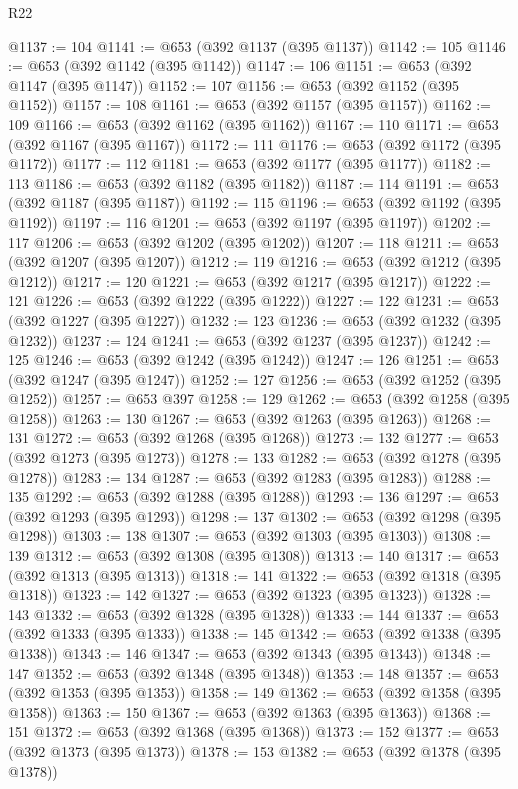 \begin{lexlean}{R22}
\begin{coremodule}
@1137 := 104
@1141 := @653 (@392 @1137 (@395 @1137))
@1142 := 105
@1146 := @653 (@392 @1142 (@395 @1142))
@1147 := 106
@1151 := @653 (@392 @1147 (@395 @1147))
@1152 := 107
@1156 := @653 (@392 @1152 (@395 @1152))
@1157 := 108
@1161 := @653 (@392 @1157 (@395 @1157))
@1162 := 109
@1166 := @653 (@392 @1162 (@395 @1162))
@1167 := 110
@1171 := @653 (@392 @1167 (@395 @1167))
@1172 := 111
@1176 := @653 (@392 @1172 (@395 @1172))
@1177 := 112
@1181 := @653 (@392 @1177 (@395 @1177))
@1182 := 113
@1186 := @653 (@392 @1182 (@395 @1182))
@1187 := 114
@1191 := @653 (@392 @1187 (@395 @1187))
@1192 := 115
@1196 := @653 (@392 @1192 (@395 @1192))
@1197 := 116
@1201 := @653 (@392 @1197 (@395 @1197))
@1202 := 117
@1206 := @653 (@392 @1202 (@395 @1202))
@1207 := 118
@1211 := @653 (@392 @1207 (@395 @1207))
@1212 := 119
@1216 := @653 (@392 @1212 (@395 @1212))
@1217 := 120
@1221 := @653 (@392 @1217 (@395 @1217))
@1222 := 121
@1226 := @653 (@392 @1222 (@395 @1222))
@1227 := 122
@1231 := @653 (@392 @1227 (@395 @1227))
@1232 := 123
@1236 := @653 (@392 @1232 (@395 @1232))
@1237 := 124
@1241 := @653 (@392 @1237 (@395 @1237))
@1242 := 125
@1246 := @653 (@392 @1242 (@395 @1242))
@1247 := 126
@1251 := @653 (@392 @1247 (@395 @1247))
@1252 := 127
@1256 := @653 (@392 @1252 (@395 @1252))
@1257 := @653 @397
@1258 := 129
@1262 := @653 (@392 @1258 (@395 @1258))
@1263 := 130
@1267 := @653 (@392 @1263 (@395 @1263))
@1268 := 131
@1272 := @653 (@392 @1268 (@395 @1268))
@1273 := 132
@1277 := @653 (@392 @1273 (@395 @1273))
@1278 := 133
@1282 := @653 (@392 @1278 (@395 @1278))
@1283 := 134
@1287 := @653 (@392 @1283 (@395 @1283))
@1288 := 135
@1292 := @653 (@392 @1288 (@395 @1288))
@1293 := 136
@1297 := @653 (@392 @1293 (@395 @1293))
@1298 := 137
@1302 := @653 (@392 @1298 (@395 @1298))
@1303 := 138
@1307 := @653 (@392 @1303 (@395 @1303))
@1308 := 139
@1312 := @653 (@392 @1308 (@395 @1308))
@1313 := 140
@1317 := @653 (@392 @1313 (@395 @1313))
@1318 := 141
@1322 := @653 (@392 @1318 (@395 @1318))
@1323 := 142
@1327 := @653 (@392 @1323 (@395 @1323))
@1328 := 143
@1332 := @653 (@392 @1328 (@395 @1328))
@1333 := 144
@1337 := @653 (@392 @1333 (@395 @1333))
@1338 := 145
@1342 := @653 (@392 @1338 (@395 @1338))
@1343 := 146
@1347 := @653 (@392 @1343 (@395 @1343))
@1348 := 147
@1352 := @653 (@392 @1348 (@395 @1348))
@1353 := 148
@1357 := @653 (@392 @1353 (@395 @1353))
@1358 := 149
@1362 := @653 (@392 @1358 (@395 @1358))
@1363 := 150
@1367 := @653 (@392 @1363 (@395 @1363))
@1368 := 151
@1372 := @653 (@392 @1368 (@395 @1368))
@1373 := 152
@1377 := @653 (@392 @1373 (@395 @1373))
@1378 := 153
@1382 := @653 (@392 @1378 (@395 @1378))

\end{coremodule}
\end{lexlean}
